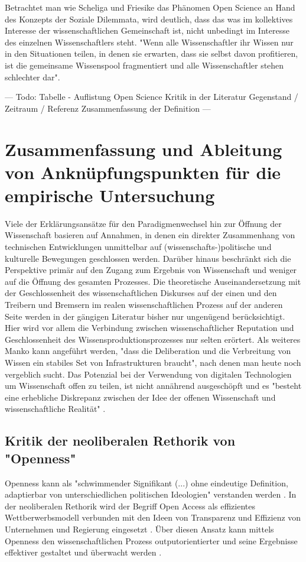 Betrachtet man wie Scheliga und Friesike das Phänomen Open Science an Hand des Konzepts der Soziale Dilemmata, wird deutlich, dass das was im kollektives Interesse der wissenschaftlichen Gemeinschaft ist, nicht unbedingt im Interesse des einzelnen Wissenschaftlers steht. "Wenn alle Wissenschaftler ihr Wissen nur in den Situationen teilen, in denen sie erwarten, dass sie selbst davon profitieren, ist die gemeinsame Wissenspool fragmentiert und alle Wissenschaftler stehen schlechter dar"\cite{Scheliga_2014}. 

--- Todo: Tabelle - Auflistung Open Science Kritik in der Literatur  
Gegenstand / Zeitraum / Referenz
Zusammenfassung der Definition --- 


\section{Zusammenfassung und Ableitung von Anknüpfungspunkten für die empirische Untersuchung}
Viele der Erklärungsansätze für den Paradigmenwechsel hin zur Öffnung der Wissenschaft basieren auf Annahmen, in denen ein direkter Zusammenhang von technischen Entwicklungen unmittelbar auf (wissenschafts-)politische und kulturelle Bewegungen geschlossen werden. Darüber hinaus beschränkt sich die Perspektive primär auf den Zugang zum Ergebnis von Wissenschaft und weniger auf die Öffnung des gesamten Prozesses. Die theoretische Auseinandersetzung mit der Geschlossenheit des wissenschaftlichen Diskurses auf der einen und den Treibern und Bremsern im realen wissenschaftlichen Prozess auf der anderen Seite werden in der gängigen Literatur bisher nur ungenügend berücksichtigt. Hier wird vor allem die Verbindung zwischen wissenschaftlicher Reputation und Geschlossenheit des Wissensproduktionsprozesses nur selten erörtert. Als weiteres Manko kann angeführt werden, "dass die Deliberation und die Verbreitung von Wissen ein stabiles Set von Infrastrukturen braucht"\cite{kelty_2004}, nach denen man heute noch vergeblich sucht. Das Potenzial bei der Verwendung von digitalen Technologien um Wissenschaft offen zu teilen, ist nicht annährend ausgeschöpft und es "besteht eine erhebliche Diskrepanz zwischen der Idee der offenen Wissenschaft und wissenschaftliche Realität" \cite{Scheliga_2014}.


\subsection{Kritik der neoliberalen Rethorik von "Openness"}

Openness kann als "schwimmender Signifikant (...) ohne eindeutige Definition, adaptierbar von unterschiedlichen politischen Ideologien" verstanden werden \cite{Adema_2014_open_access}. In der neoliberalen Rethorik wird der Begriff Open Access als effizientes Wettberwerbsmodell verbunden mit den Ideen von Transparenz und Effizienz von Unternehmen und Regierung eingesetzt \cite{tkacz_2012_open}. Über diesen Ansatz kann mittels Openness den wissenschaftlichen Prozess outputorientierter und seine Ergebnisse effektiver gestaltet und überwacht werden \cite{adema_2010_oaoverview} . 


